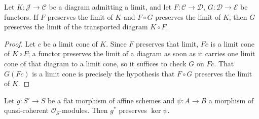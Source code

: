 \begin{lemma}\leanok
  \label{lem:preserves_limit_comp_cancel}
  Let \(K : \mathcal{J} \to \mathcal{C}\) be a diagram admitting a limit, and let
  \(F : \mathcal{C} \to \mathcal{D}\), \(G : \mathcal{D} \to \mathcal{E}\) be functors. If \(F\)
  preserves the limit of \(K\) and \(F \circ G\) preserves the limit of \(K\), then \(G\)
  preserves the limit of the transported diagram \(K \circ F\).
\end{lemma}

\begin{proof}\leanok
  Let \(c\) be a limit cone of \(K\). Since \(F\) preserves that limit, \(F c\) is a limit cone of
  \(K \circ F\); a functor preserves the limit of a diagram as soon as it carries one limit cone
  of that diagram to a limit cone, so it suffices to check \(G\) on \(F c\). That \(G (F c)\) is a
  limit cone is precisely the hypothesis that \(F \circ G\) preserves the limit of \(K\).
\end{proof}

\begin{lemma}\leanok
  \label{lem:flat_pullback_kernels_qcoh}
  Let \(g : S' \to S\) be a flat morphism of affine schemes and \(\psi : A \to B\) a morphism of
  quasi-coherent \(\mathcal{O}_S\)-modules. Then \(g^*\) preserves \(\ker \psi\).
\end{lemma}

